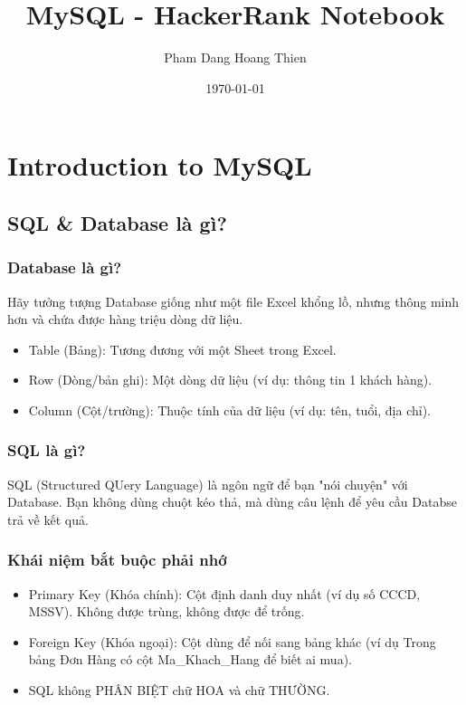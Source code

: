 \documentclass[12pt,a4paper]{article}
\title{MySQL - HackerRank Notebook}
\author{Pham Dang Hoang Thien}
\date{\today}
\begin{document}

\maketitle
\thispagestyle{titlefooter} %

\clearpage                 %
\setcounter{page}{1}       %
\tableofcontents
\newpage
\section{Introduction to MySQL}
\subsection{SQL \& Database là gì?}
\subsubsection{Database là gì?}
Hãy tưởng tượng Database giống như một file Excel khổng lồ, nhưng thông minh hơn và chứa được hàng triệu dòng dữ liệu.
\begin{itemize}
    \item Table (Bảng): Tương đương với một Sheet trong Excel.
    \item Row (Dòng/bản ghi): Một dòng dữ liệu (ví dụ: thông tin 1 khách hàng).
    \item Column (Cột/trường): Thuộc tính của dữ liệu (ví dụ: tên, tuổi, địa chỉ).
\end{itemize}
\subsubsection{SQL là gì?}
SQL (Structured QUery Language) là ngôn ngữ để bạn "nói chuyện" với Database. Bạn không dùng chuột kéo thả, mà dùng câu lệnh 
để yêu cầu Databse trả về kết quả.
\subsubsection{Khái niệm bắt buộc phải nhớ}
\begin{itemize}
    \item Primary Key (Khóa chính): Cột định danh duy nhất (ví dụ số CCCD, MSSV). Không được trùng, không được để trống.
    \item Foreign Key (Khóa ngoại): Cột dùng để nối sang bảng khác (ví dụ Trong bảng Đơn Hàng có cột Ma\_Khach\_Hang để biết ai mua).
    \item SQL không PHÂN BIỆT chữ HOA và chữ THƯỜNG.
\end{itemize}
\end{document}
